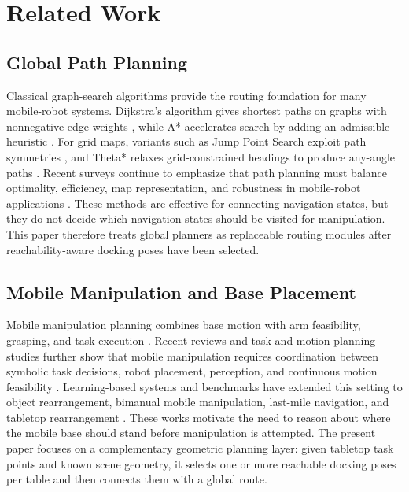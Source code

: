 \section{Related Work}
\label{sec:related}

\subsection{Global Path Planning}
Classical graph-search algorithms provide the routing foundation for many mobile-robot systems. Dijkstra's algorithm gives shortest paths on graphs with nonnegative edge weights \cite{dijkstra1959note}, while A* accelerates search by adding an admissible heuristic \cite{hart1968formal}. For grid maps, variants such as Jump Point Search exploit path symmetries \cite{harabor2011online}, and Theta* relaxes grid-constrained headings to produce any-angle paths \cite{nash2007theta}. Recent surveys continue to emphasize that path planning must balance optimality, efficiency, map representation, and robustness in mobile-robot applications \cite{liu2023pathplanning}. These methods are effective for connecting navigation states, but they do not decide which navigation states should be visited for manipulation. This paper therefore treats global planners as replaceable routing modules after reachability-aware docking poses have been selected.

\subsection{Mobile Manipulation and Base Placement}
Mobile manipulation planning combines base motion with arm feasibility, grasping, and task execution \cite{siciliano2009robotics,lynch2017modern}. Recent reviews and task-and-motion planning studies further show that mobile manipulation requires coordination between symbolic task decisions, robot placement, perception, and continuous motion feasibility \cite{sandakalum2022motion,zhao2024survey,zhang2022grop}. Learning-based systems and benchmarks have extended this setting to object rearrangement, bimanual mobile manipulation, last-mile navigation, and tabletop rearrangement \cite{gu2023multiskill,fu2024mobilealoha,zhang2025momakitchen,hu2025mobiletabletop}. These works motivate the need to reason about where the mobile base should stand before manipulation is attempted. The present paper focuses on a complementary geometric planning layer: given tabletop task points and known scene geometry, it selects one or more reachable docking poses per table and then connects them with a global route.

